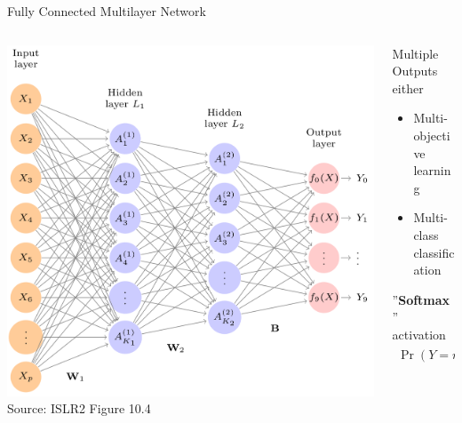 \documentclass[ignorenonframetext,xcolor=x11names]{beamer}
\begin{document}
\begin{frame}{Fully Connected Multilayer Network}
\begin{columns}
\begin{column}{.66\textwidth}
\centering
\includegraphics[width=\textwidth]{screen2.png} \\

\scriptsize Source: ISLR2 Figure 10.4
\end{column}
\begin{column}{.33\textwidth}
Multiple Outputs either
\begin{itemize}
   \item Multi-objective learning
   \item Multi-class classification
\end{itemize}
\vspace{\baselineskip}

''\textbf{Softmax}'' activation
\begin{align*}
\Pr(Y=m|X) = \frac{e^{Z_m}}{\sum_{l=0}^n e^{Z_l}}
\end{align*}
\end{column}
\end{columns}
\end{frame}
\end{document}
